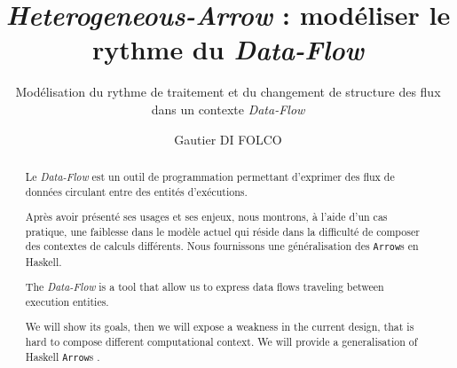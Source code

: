 \documentclass{llncs}
\newcommand{\DF}{\emph{Data-Flow} }
\newcommand{\SA}{\emph{Heterogeneous-Arrow} }
\newcommand{\Arrs}{\lstinline{Arrow}s }
\begin{document}
\title{\SA : modéliser le rythme du \DF}


\subtitle{Modélisation du rythme de traitement et du changement de structure des flux dans un contexte \DF}


\author{Gautier DI FOLCO}







\maketitle

\begin{abstract}
Le \DF est un outil de programmation permettant d'exprimer des flux de
données circulant entre des entités d'exécutions.

Après avoir présenté ses usages et ses enjeux, nous montrons, à l'aide d'un
cas pratique, une faiblesse dans le modèle actuel qui réside dans la difficulté
de composer des contextes de calculs différents.
Nous fournissons une généralisation des \Arrs en Haskell.
\end{abstract}

\begin{abstract}
The \DF is a tool that allow us to express data flows traveling between execution entities.

We will show its goals, then we will expose a weakness in the current design, that is hard to compose different computational context.
We will provide a generalisation of Haskell \Arrs.
\end{abstract}
\end{document}

